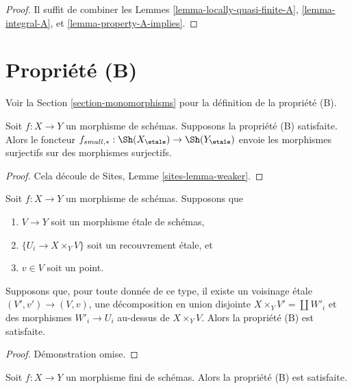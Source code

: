 \begin{proof}
Il suffit de combiner les
Lemmes \ref{lemma-locally-quasi-finite-A},
\ref{lemma-integral-A}, et
\ref{lemma-property-A-implies}.
\end{proof}



\section{Propri\'et\'e (B)}
\label{section-B}

\noindent
Voir la Section \ref{section-monomorphisms} pour la d\'efinition de la propri\'et\'e
(B).

\begin{lemma}
\label{lemma-property-B-implies}
Soit $f : X \to Y$ un morphisme de sch\'emas. Supposons la propri\'et\'e (B) satisfaite.
Alors le foncteur
$f_{small, *} :
\Sh(X_\etale)
\to
\Sh(Y_\etale)$
envoie les morphismes surjectifs sur des morphismes surjectifs.
\end{lemma}

\begin{proof}
Cela d\'ecoule de
Sites, Lemme \ref{sites-lemma-weaker}.
\end{proof}

\begin{lemma}
\label{lemma-simplify-B}
Soit $f : X \to Y$ un morphisme de sch\'emas. Supposons que
\begin{enumerate}
\item $V \to Y$ soit un morphisme \'etale de sch\'emas,
\item $\{U_i \to X \times_Y V\}$ soit un recouvrement \'etale, et
\item $v \in V$ soit un point.
\end{enumerate}
Supposons que, pour toute donn\'ee de ce type, il existe un voisinage \'etale
$(V', v') \to (V, v)$, une d\'ecomposition en union disjointe
$X \times_Y V' = \coprod W'_i$ et des morphismes $W'_i \to U_i$
au-dessus de $X \times_Y V$. Alors la propri\'et\'e (B) est satisfaite.
\end{lemma}

\begin{proof}
D\'emonstration omise.
\end{proof}

\begin{lemma}
\label{lemma-finite-B}
Soit $f : X \to Y$ un morphisme fini de sch\'emas.
Alors la propri\'et\'e (B) est satisfaite.
\end{lemma}

